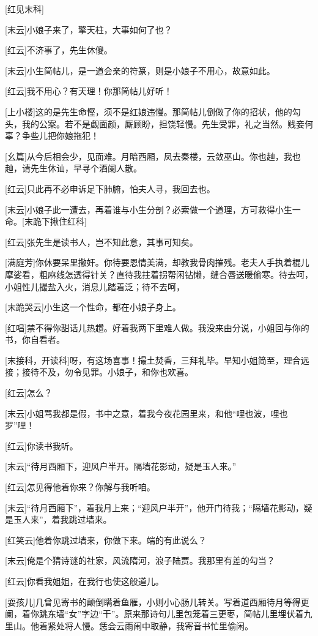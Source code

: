 \documentclass{book}
\begin{document}
[红见末科]

[末云]小娘子来了，擎天柱，大事如何了也？

[红云]不济事了，先生休傻。

[末云]小生简帖儿，是一道会亲的符篆，则是小娘子不用心，故意如此。

[红云]我不用心？有天理！你那简帖儿好听！

[上小楼]这的是先生命慳，须不是红娘违慢。那简帖儿倒做了你的招状，他的勾头，我的公案。若不是觑面颜，厮顾盼，担饶轻慢。先生受罪，礼之当然。贱妾何辜？争些儿把你娘拖犯！

[幺篇]从今后相会少，见面难。月暗西厢，凤去秦楼，云敛巫山。你也赸，我也赸，请先生休讪，早寻个酒阑人散。

[红云]只此再不必申诉足下肺腑，怕夫人寻，我回去也。

[末云]小娘子此一遭去，再着谁与小生分剖？必索做一个道理，方可救得小生一命。[末跪下揪住红科]

[红云]张先生是读书人，岂不知此意，其事可知矣。

[满庭芳]你休要呆里撒奸。你待要恩情美满，却教我骨肉摧残。老夫人手执着棍儿摩娑看，粗麻线怎透得针关？直待我拄着拐帮闲钻懒，缝合唇送暖偷寒。待去呵，小姐性儿撮盐入火，消息儿踏着泛；待不去呵，

[末跪哭云]小生这一个性命，都在小娘子身上。

[红唱]禁不得你甜话儿热趱。好着我两下里难人做。我没来由分说，小姐回与你的书，你自看者。

[末接科，开读科]呀，有这场喜事！撮土焚香，三拜礼毕。早知小姐简至，理合远接；接待不及，勿令见罪。小娘子，和你也欢喜。

[红云]怎么？

[末云]小姐骂我都是假，书中之意，着我今夜花园里来，和他``哩也波，哩也罗''哩！

[红云]你读书我听。

[末云]``待月西厢下，迎风户半开。隔墙花影动，疑是玉人来。''

[红云]怎见得他着你来？你解与我听咱。

[末云]``待月西厢下''，着我月上来；``迎风户半开''，他开门待我；``隔墙花影动，疑是玉人来''，着我跳过墙来。

[红笑云]他着你跳过墙来，你做下来。端的有此说么？

[末云]俺是个猜诗谜的社家，风流隋河，浪子陆贾。我那里有差的勾当？

[红云]你看我姐姐，在我行也使这般道儿。

[耍孩儿]几曾见寄书的颠倒瞒着鱼雁，小则小心肠儿转关。写着道西厢待月等得更阑，着你跳东墙``女''字边``干''。原来那诗句儿里包笼着三更枣，简帖儿里埋伏着九里山。他着紧处将人慢。恁会云雨闹中取静，我寄音书忙里偷闲。
\end{document}
